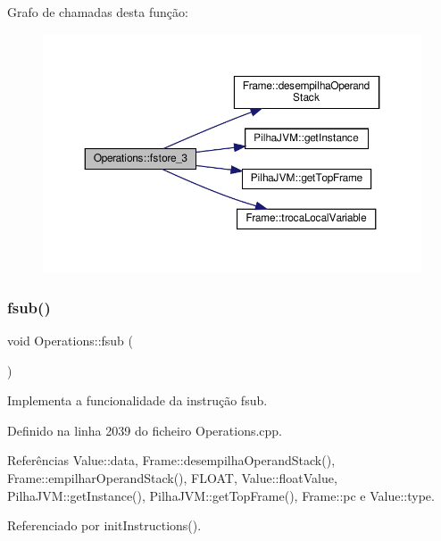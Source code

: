 Grafo de chamadas desta função\+:\nopagebreak
\begin{figure}[H]
\begin{center}
\leavevmode
\includegraphics[width=350pt]{classOperations_a00786621697e0e6e6c084c3cee1599ae_cgraph}
\end{center}
\end{figure}
\mbox{\label{classOperations_a138cd74b7244e430085eb4850de2b481}} 
\subsubsection{\texorpdfstring{fsub()}{fsub()}}
{\footnotesize\ttfamily void Operations\+::fsub (\begin{DoxyParamCaption}{ }\end{DoxyParamCaption})\hspace{0.3cm}{\ttfamily [private]}}



Implementa a funcionalidade da instrução fsub. 



Definido na linha 2039 do ficheiro Operations.\+cpp.



Referências Value\+::data, Frame\+::desempilha\+Operand\+Stack(), Frame\+::empilhar\+Operand\+Stack(), F\+L\+O\+AT, Value\+::float\+Value, Pilha\+J\+V\+M\+::get\+Instance(), Pilha\+J\+V\+M\+::get\+Top\+Frame(), Frame\+::pc e Value\+::type.



Referenciado por init\+Instructions().

